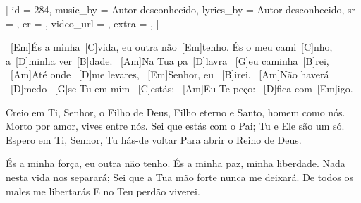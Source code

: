 [
    id          = {284},
    music_by    = {Autor desconhecido},
    lyrics_by   = {Autor desconhecido},
    sr          = {},
    cr          = {},
    video_url   = {},
    extra       = {},
]

\beginverse
\ [Em]És a minha\ [C]vida, eu outra não\ [Em]tenho. 
És o meu cami\ [C]nho, a\ [D]minha ver\ [B]dade.
\ [Am]Na Tua pa\ [D]lavra \ [G]eu caminha\ [B]rei,
\ [Am]Até onde \ [D]me levares, \ [Em]Senhor, eu \ [B]irei.
\ [Am]Não haverá \ [D]medo \ [G]se Tu em mim \ [C]estás; 
\ [Am]Eu Te peço: \ [D]fica com\ [Em]igo. 
\endverse

\beginverse
Creio em Ti, Senhor, o Filho de Deus, 
Filho eterno e Santo, homem como nós. 
Morto por amor, vives entre nós. 
Sei que estás com o Pai; Tu e Ele são um só. 
Espero em Ti, Senhor, Tu hás-de voltar 
Para abrir o Reino de Deus. 
\endverse

\beginverse
És a minha força, eu outra não tenho. 
És a minha paz, minha liberdade. 
Nada nesta vida nos separará; 
Sei que a Tua mão forte nunca me deixará. 
De todos os males me libertarás 
E no Teu perdão viverei.
\endverse

\endsong

